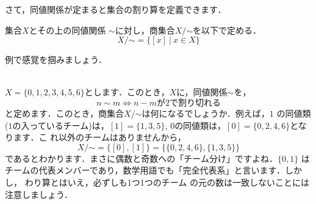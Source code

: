
さて，同値関係が定まると集合の割り算を定義できます．

\begin{defi}[商集合]
 集合$X$とその上の同値関係
 $\sim$に対し，商集合$X/\mathord{\sim}$を以下で定める．
 \[
   X/\mathord{\sim}=\{[x]\ |\ x\in X\}
 \]
\end{defi}

例で感覚を掴みましょう．

 \begin{Ex}{\ } \\
  $X=\{0,1,2,3,4,5,6\}$とします．このとき，$X$に，同値関係$\sim$を，
 \[
  n\sim m\Leftrightarrow n-mが2で割り切れる
 \]
 と定めます．このとき，商集合$X/\mathord{\sim}$は何になるでしょうか．例えば，$1$
  の同値類($1$の入っているチーム)は，$[1]=\{1,3,5\}$, $0$の同値類は，$[0]=\{0,2,4,6\}$となります．こ
  れ以外のチームはありませんから，
  \[
    X/\mathord{\sim}=\{[0],[1]\}=\{\{0,2,4,6\},\{1,3,5\}\}
  \]
であるとわかります．まさに偶数と奇数への「チーム分け」ですよね．$\{0,1\}$
  はチームの代表メンバーであり，数学用語でも「完全代表系」と言います．しかし，
  わり算とはいえ，必ずしも1つ1つのチーム
  の元の数は一致しないことには注意しましょう．
 \end{Ex}

